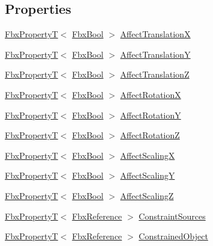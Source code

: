 \subsection*{Properties}
\begin{DoxyCompactItemize}
\item 
\hyperlink{class_fbx_property_t}{Fbx\+PropertyT}$<$ \hyperlink{fbxtypes_8h_a92e0562b2fe33e76a242f498b362262e}{Fbx\+Bool} $>$ \hyperlink{class_fbx_constraint_parent_ac67f39b8f34fce85fdfba40823d243fe}{Affect\+TranslationX}
\item 
\hyperlink{class_fbx_property_t}{Fbx\+PropertyT}$<$ \hyperlink{fbxtypes_8h_a92e0562b2fe33e76a242f498b362262e}{Fbx\+Bool} $>$ \hyperlink{class_fbx_constraint_parent_a7aa3f5ad68f44254492c70e8f7201750}{Affect\+TranslationY}
\item 
\hyperlink{class_fbx_property_t}{Fbx\+PropertyT}$<$ \hyperlink{fbxtypes_8h_a92e0562b2fe33e76a242f498b362262e}{Fbx\+Bool} $>$ \hyperlink{class_fbx_constraint_parent_ab173e3fc6e6fd0d1cfca4f3227aec6b2}{Affect\+TranslationZ}
\item 
\hyperlink{class_fbx_property_t}{Fbx\+PropertyT}$<$ \hyperlink{fbxtypes_8h_a92e0562b2fe33e76a242f498b362262e}{Fbx\+Bool} $>$ \hyperlink{class_fbx_constraint_parent_ab364319598a6be917048f261160aced4}{Affect\+RotationX}
\item 
\hyperlink{class_fbx_property_t}{Fbx\+PropertyT}$<$ \hyperlink{fbxtypes_8h_a92e0562b2fe33e76a242f498b362262e}{Fbx\+Bool} $>$ \hyperlink{class_fbx_constraint_parent_a50b11f7aca12a04e5048680e0f7af486}{Affect\+RotationY}
\item 
\hyperlink{class_fbx_property_t}{Fbx\+PropertyT}$<$ \hyperlink{fbxtypes_8h_a92e0562b2fe33e76a242f498b362262e}{Fbx\+Bool} $>$ \hyperlink{class_fbx_constraint_parent_a2b6447babd670eb5023143d1773cdaf8}{Affect\+RotationZ}
\item 
\hyperlink{class_fbx_property_t}{Fbx\+PropertyT}$<$ \hyperlink{fbxtypes_8h_a92e0562b2fe33e76a242f498b362262e}{Fbx\+Bool} $>$ \hyperlink{class_fbx_constraint_parent_ab4f8c487608b32feff9804c7e70e851e}{Affect\+ScalingX}
\item 
\hyperlink{class_fbx_property_t}{Fbx\+PropertyT}$<$ \hyperlink{fbxtypes_8h_a92e0562b2fe33e76a242f498b362262e}{Fbx\+Bool} $>$ \hyperlink{class_fbx_constraint_parent_a32b210fd27c0e55456741428987755fe}{Affect\+ScalingY}
\item 
\hyperlink{class_fbx_property_t}{Fbx\+PropertyT}$<$ \hyperlink{fbxtypes_8h_a92e0562b2fe33e76a242f498b362262e}{Fbx\+Bool} $>$ \hyperlink{class_fbx_constraint_parent_abbbb60d845ab61bede0b28f5a7defa22}{Affect\+ScalingZ}
\item 
\hyperlink{class_fbx_property_t}{Fbx\+PropertyT}$<$ \hyperlink{fbxtypes_8h_a44df6a2eec915cf27cd481e5c5e48a24}{Fbx\+Reference} $>$ \hyperlink{class_fbx_constraint_parent_a02690debabacd0fe4b643cbb04c042a7}{Constraint\+Sources}
\item 
\hyperlink{class_fbx_property_t}{Fbx\+PropertyT}$<$ \hyperlink{fbxtypes_8h_a44df6a2eec915cf27cd481e5c5e48a24}{Fbx\+Reference} $>$ \hyperlink{class_fbx_constraint_parent_aaaf70448aed2fafcd4f2d7e1a4409a6e}{Constrained\+Object}
\end{DoxyCompactItemize}
